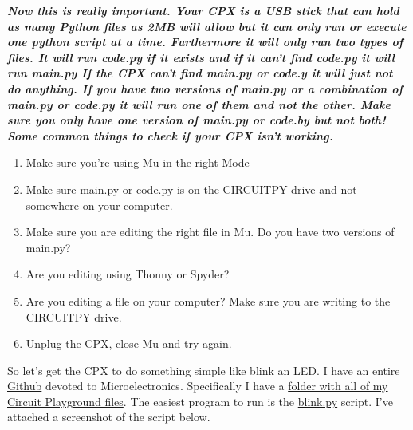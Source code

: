 {\bf \it Now this is really important. Your CPX is a USB stick that can hold as
many Python files as 2MB will allow but it can only run or execute one
python script at a time. Furthermore it will only run two types of
files. It will run code.py if it exists and if it can't find code.py
it will run main.py If the CPX can't find main.py or code.y it will
just not do anything. If you have two versions of main.py or a
combination of main.py or code.py it will run one of them and not the
other. Make sure you only have one version of main.py or code.by but
not both! Some common things to check if your CPX isn't working. }
\begin{enumerate}[itemsep=-5pt]
  \item Make sure you're using Mu in the right Mode
  \item Make sure main.py or code.py is on the CIRCUITPY drive and not somewhere on your computer.
  \item Make sure you are editing the right file in Mu. Do you have two versions of main.py?
  \item Are you editing using Thonny or Spyder?
  \item Are you editing a file on your computer? Make sure you are writing to the CIRCUITPY drive.
  \item Unplug the CPX, close Mu and try again.
\end{enumerate}
So let’s get the CPX to do something simple like blink an LED. I have
an entire
\href{https://github.com/cmontalvo251/Microcontrollers}{Github}
devoted to Microelectronics. Specifically I have a
\href{https://github.com/cmontalvo251/Microcontrollers/tree/master/Circuit_Playground/CircuitPython}{folder
  with all of my Circuit Playground files}. The easiest program to 
run is the \href{https://github.com/cmontalvo251/Microcontrollers/blob/master/Circuit_Playground/CircuitPython/blink.py}{blink.py} script. I’ve attached a screenshot of the script
below. 
